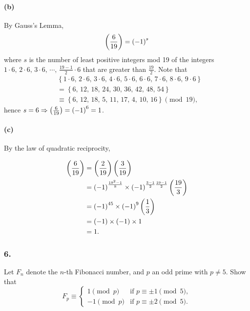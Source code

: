 \paragraph{(b)} By Gauss's Lemma,
\[
    \left(\frac{6}{19}\right) = \left(-1\right)^s
\]
where $s$ is the number of least positive integers mod 19 of the
integers $1\cdot 6,\,2\cdot 6,\,3\cdot 6,\,\cdots,\,\frac{19-1}{2}\cdot 6$
that are greater than $\frac{19}{2}$.
Note that
\begin{align*}
    & \left\{ 1\cdot 6,\,2\cdot 6,\,3\cdot 6,\,4\cdot 6,\,
    5\cdot 6,\,6\cdot 6,\,7\cdot 6,\,8\cdot 6,\,9\cdot 6\right\} \\
    &= \left\{ 6,\,12,\,18,\,24,\,30,\,36,\,42,\,48,\,54\right\} \\
    &\equiv \left\{ 6,\,12,\,18,\,5,\,11,\,17,\,4,\,10,\,16 \right\} \pmod{19},
\end{align*}
hence $s=6 \Rightarrow \left(\frac{6}{19}\right)=\left(-1\right)^6=1$.

\paragraph{(c)} By the law of quadratic reciprocity,

\begin{align*}
    \left(\frac{6}{19}\right) &= \left(\frac{2}{19}\right)\left(\frac{3}{19}\right) \\
    &= \left(-1\right)^{\frac{19^2-1}{8}} \times \left(-1\right)^{\frac{3-1}{2}\frac{19-1}{2}}\left(\frac{19}{3}\right) \\
    &= \left(-1\right)^{45} \times \left( -1 \right)^{9} \left(\frac{1}{3}\right) \\
    &= \left(-1\right) \times \left(-1\right) \times 1 \\
    &= 1.
\end{align*}

\subsubsection{6.} Let $F_n$ denote the $n$-th Fibonacci number,
and $p$ an odd prime with $p \neq 5$. Show that
\[
    F_p \equiv \begin{cases}
        1 \pmod{p} & \mbox{if } p \equiv \pm 1 \pmod{5},\\
        -1 \pmod{p} & \mbox{if } p \equiv \pm 2 \pmod{5}.
    \end{cases}
\]

